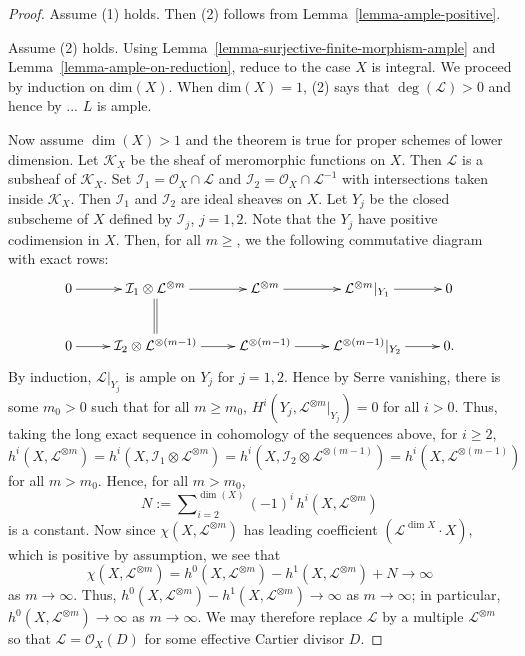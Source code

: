 \begin{proof}
Assume (1) holds.
Then (2) follows from Lemma~\ref{lemma-ample-positive}.

Assume (2) holds.
Using Lemma~\ref{lemma-surjective-finite-morphism-ample} and
Lemma~\ref{lemma-ample-on-reduction}, reduce to the case $X$ is integral.
We proceed by induction on $\mathrm{dim}(X)$.
When $\mathrm{dim}(X) = 1$, (2) says that $\deg(\mathcal{L}) > 0$ and hence
by ... $L$ is ample.

Now assume $\dim(X) > 1$ and the theorem is true for proper schemes of lower
dimension.
Let $\mathcal{K}_X$ be the sheaf of meromorphic functions on $X$.
Then $\mathcal{L}$ is a subsheaf of $\mathcal{K}_X$.
Set $\mathcal{I}_1 = \mathcal{O}_X \cap \mathcal{L}$
and $\mathcal{I}_2 = \mathcal{O}_X \cap \mathcal{L}^{-1}$ with intersections
taken inside $\mathcal{K}_X$.
Then $\mathcal{I}_1$ and $\mathcal{I}_2$ are ideal sheaves on $X$.
Let $Y_j$ be the closed subscheme of $X$ defined by $\mathcal{I}_j$, $j = 1,2$.
Note that the $Y_j$ have positive codimension in $X$.
Then, for all $m \geq $, we the following commutative diagram with exact rows:
$$
\xymatrix{
  0 \ar[r]
    & \mathcal{I}_1 \otimes \mathcal{L}^{\otimes m} \ar[r] \ar@{=}[d]
    & \mathcal{L}^{\otimes m} \ar[r]
    & \mathcal{L}^{\otimes m}\rvert_{Y_1} \ar[r]
    & 0 \\
  0 \ar[r]
    & \mathcal{I}_2 \otimes \mathcal{L}^{\otimes (m-1)} \ar[r]
    & \mathcal{L}^{\otimes (m-1)} \ar[r]
    & \mathcal{L}^{\otimes (m-1)}\rvert_{Y_2} \ar[r]
    & 0.
}
$$
By induction, $\mathcal{L}\rvert_{Y_j}$ is ample on $Y_j$ for $j = 1,2$.
Hence by Serre vanishing, there is some $m_0 > 0$
such that for all $m \geq m_0$,
$H^i(Y_j,\mathcal{L}^{\otimes m}\rvert_{Y_j}) = 0$ for all $i > 0$.
Thus, taking the long exact sequence in cohomology of the sequences above,
for $i \geq 2$,
$$
  h^i(X,\mathcal{L}^{\otimes m})
    = h^i(X,\mathcal{I}_1 \otimes \mathcal{L}^{\otimes m})
    = h^i(X,\mathcal{I}_2 \otimes \mathcal{L}^{\otimes (m - 1)})
    = h^i(X,\mathcal{L}^{\otimes (m-1)})
$$
for all $m > m_0$.
Hence, for all $m > m_0$,
$$
N := \sum\nolimits_{i = 2}^{\dim(X)} (-1)^i\,h^i(X,\mathcal{L}^{\otimes m})
$$
is a constant.
Now since $\chi(X,\mathcal{L}^{\otimes m})$ has leading coefficient
$(\mathcal{L}^{\dim X} \cdot X)$, which is positive by assumption,
we see that
$$
  \chi(X,\mathcal{L}^{\otimes m})
    = h^0(X,\mathcal{L}^{\otimes m}) - h^1(X,\mathcal{L}^{\otimes m})
      + N \to \infty
$$
as $m \to \infty$. Thus,
$h^0(X,\mathcal{L}^{\otimes m}) - h^1(X,\mathcal{L}^{\otimes m}) \to \infty$
as $m \to \infty$; in particular,
$h^0(X,\mathcal{L}^{\otimes m}) \to \infty$ as $m \to \infty$.
We may therefore replace $\mathcal{L}$ by a multiple $\mathcal{L}^{\otimes m}$
so that $\mathcal{L} = \mathcal{O}_X(D)$ for some effective Cartier divisor
$D$.


\end{proof}
